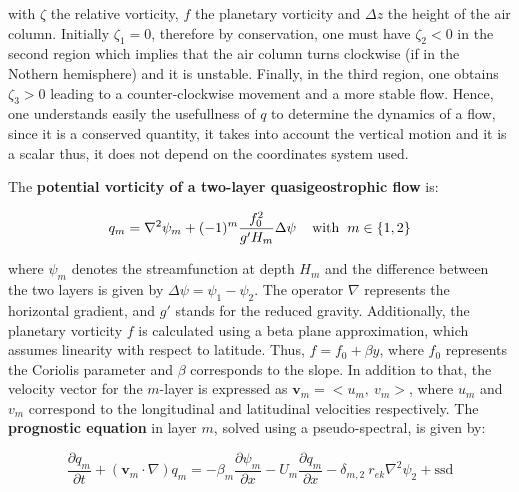 with $\zeta$ the relative vorticity, $f$ the planetary vorticity and $\Delta z$ the height of the air column. Initially $\zeta_1 = 0$, therefore by conservation, one must have $\zeta_2 < 0$ in the second region which implies that the air column turns clockwise (if in the Nothern hemisphere) and it is unstable. Finally, in the third region, one obtains $\zeta_3 > 0$ leading to a counter-clockwise movement and a more stable flow. Hence, one understands easily the usefullness of $q$ to determine the dynamics of a flow, since it is a conserved quantity, it takes into account the vertical motion and it is a scalar thus, it does not depend on the coordinates system used.

\newpage

The \textbf{potential vorticity of a two-layer quasigeostrophic flow} is:

\vspace{-0.3em}
\begin{equation}
q_m=\nabla^2 \psi_m+(-1)^m \frac{f_0^2}{g^{\prime} H_m} \Delta \psi \hspace{4mm} \text{with} \hspace{2mm} m \in \{1, 2\} 
\label{C2 - EQ - Potential vorticity in the two-layer quasigeostrophic flow}
\end{equation}


where $\psi_m$ denotes the streamfunction at depth $H_m$ and the difference between the two layers is given by $\Delta \psi = \psi_1 - \psi_2$. The operator $\nabla$ represents the horizontal gradient, and $g'$ stands for the reduced gravity. Additionally, the planetary vorticity $f$ is calculated using a beta plane approximation, which assumes linearity with respect to latitude. Thus, $f = f_0 + \beta y$, where $f_0$ represents the Coriolis parameter and $\beta$ corresponds to the slope. In addition to that, the velocity vector for the $m$-layer is expressed as $\mathbf{v}_m = <u_m, \ v_m>$, where $u_m$ and $v_m$ correspond to the longitudinal and latitudinal velocities respectively. The \textbf{prognostic equation} in layer $m$, solved using a pseudo-spectral, is given by:

\begin{equation}
	\dfrac{\partial q_m}{\partial t} + (\mathbf{v}_m \cdot \nabla) q_m = - \beta_m \dfrac{\partial \psi_m}{\partial x} - U_m \dfrac{\partial q_m}{\partial x}  - \delta_{m, 2} \ r_{ek} \nabla^2 \psi_2 + \text{ssd}
\label{C2 - EQ - Prognostic equation for the potential vorticity in the two-layer quasigeostrophic flow}
\end{equation}
\vspace{-0.2em}

